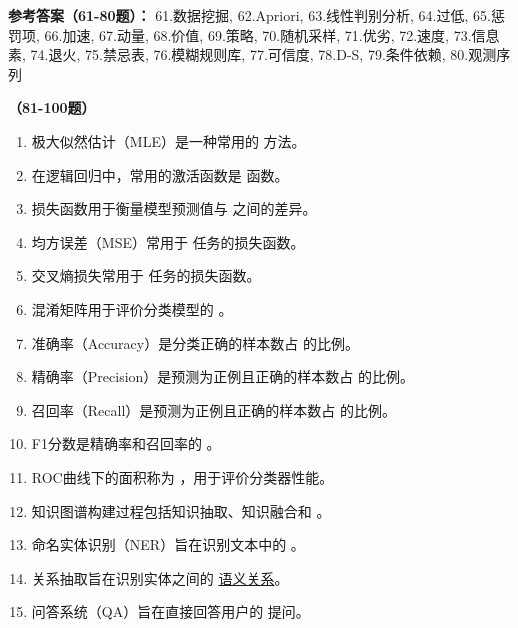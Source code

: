 \textbf{参考答案（61-80题）：}
61.数据挖掘, 62.Apriori, 63.线性判别分析, 64.过低, 65.惩罚项, 66.加速, 67.动量, 68.价值, 69.策略, 70.随机采样, 
71.优劣, 72.速度, 73.信息素, 74.退火, 75.禁忌表, 76.模糊规则库, 77.可信度, 78.D-S, 79.条件依赖, 80.观测序列

\vspace{1em}
\textbf{（81-100题）}
\begin{enumerate}[resume,leftmargin=2em,itemsep=1pt]
\item 极大似然估计（MLE）是一种常用的 \underline{\hspace{3em}} 方法。
\item 在逻辑回归中，常用的激活函数是 \underline{\hspace{3em}} 函数。
\item 损失函数用于衡量模型预测值与 \underline{\hspace{3em}} 之间的差异。
\item 均方误差（MSE）常用于 \underline{\hspace{3em}} 任务的损失函数。
\item 交叉熵损失常用于 \underline{\hspace{3em}} 任务的损失函数。
\item 混淆矩阵用于评价分类模型的 \underline{\hspace{3em}}。
\item 准确率（Accuracy）是分类正确的样本数占 \underline{\hspace{3em}} 的比例。
\item 精确率（Precision）是预测为正例且正确的样本数占 \underline{\hspace{3em}} 的比例。
\item 召回率（Recall）是预测为正例且正确的样本数占 \underline{\hspace{3em}} 的比例。
\item F1分数是精确率和召回率的 \underline{\hspace{3em}}。
\item ROC曲线下的面积称为 \underline{\hspace{3em}}，用于评价分类器性能。
\item 知识图谱构建过程包括知识抽取、知识融合和 \underline{\hspace{3em}}。
\item 命名实体识别（NER）旨在识别文本中的 \underline{\hspace{3em}}。
\item 关系抽取旨在识别实体之间的 \underline{语义关系}。
\item 问答系统（QA）旨在直接回答用户的 \underline{\hspace{3em}} 提问。

\end{enumerate}
